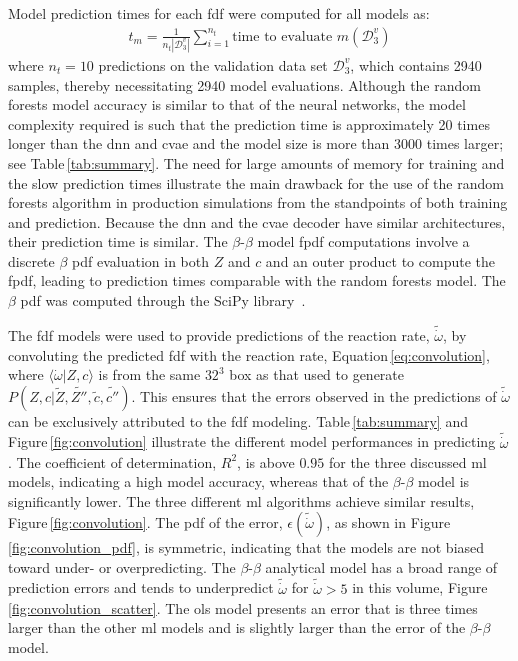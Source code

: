 \documentclass[review]{elsarticle}
\newcommand{\wt}[1]{\widetilde{#1}}
\begin{document}
Model prediction times for each \gls{fdf} were computed for all
models as:
\begin{align}
  \label{eq:predict}
  t_m = \frac{1}{n_t |\mathcal{D}_3^v|} \sum_{i=1}^{n_t} \text{time to evaluate } m(\mathcal{D}_3^v)
\end{align}
where $n_t=10$ predictions on the validation data set
$\mathcal{D}_3^v$, which contains 2940 samples, thereby necessitating
2940 model evaluations. Although the random forests model accuracy is
similar to that of the neural networks, the model complexity required
is such that the prediction time is approximately 20 times longer than
the \gls{dnn} and \gls{cvae} and the model size is more than 3000 times
larger; see Table\,\ref{tab:summary}. The need for large amounts of memory
for training and the slow prediction times illustrate the main
drawback for the use of the random forests algorithm in production
simulations from the standpoints of both training and prediction. Because the
\gls{dnn} and the \gls{cvae} decoder have similar architectures, their
prediction time is similar. The $\beta$-$\beta$ model 
\gls{fpdf} computations involve a discrete $\beta$ \gls{pdf} evaluation
in both $Z$ and $c$ and an outer product to compute the 
\gls{fpdf}, leading to prediction times comparable with the random
forests model. The $\beta$ \gls{pdf} was computed through the SciPy
library~\cite{Jones2001}.

The \gls{fdf} models were used to provide predictions of the reaction
rate, $\wt{\dot{\omega}}$, by convoluting the predicted \gls{fdf} with
the reaction rate, Equation\,\ref{eq:convolution}, where
$\langle \dot{\omega} | Z, c \rangle$ is from the same $32^3$ box as
that used to generate $P(Z,c | \wt{Z}, \wt{Z''}, \wt{c},
\wt{c''})$. This ensures that the errors observed in the predictions
of $\wt{\dot{\omega}}$ can be exclusively attributed to the \gls{fdf}
modeling. Table\,\ref{tab:summary} and Figure\,\ref{fig:convolution}
illustrate the different model performances in predicting
$\wt{\dot{\omega}}$. The coefficient of determination, $R^2$, is above
$0.95$ for the three discussed \gls{ml} models, indicating a high
model accuracy, whereas that of the $\beta$-$\beta$ model is
significantly lower. The three different \gls{ml} algorithms achieve
similar results, Figure\,\ref{fig:convolution}. The \gls{pdf} of the
error, $\epsilon(\wt{\dot{\omega}})$, as shown in
Figure\,\ref{fig:convolution_pdf}, is symmetric, indicating that the
models are not biased toward under- or overpredicting. The
$\beta$-$\beta$ analytical model has a broad range of prediction
errors and tends to underpredict $\wt{\dot{\omega}}$ for
$\wt{\dot{\omega}} > 5$ in this volume,
Figure\,\ref{fig:convolution_scatter}. The \gls{ols} model presents an
error that is three times larger than the other \gls{ml} models and is
slightly larger than the error of the $\beta$-$\beta$ model.
\end{document}
